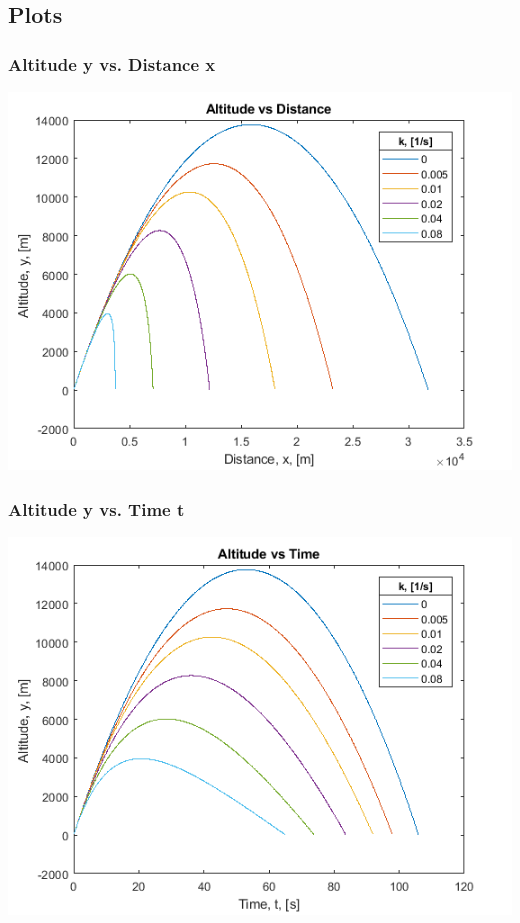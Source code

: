 \documentclass[oneside]{article}
\begin{document}
\subsection{Plots}
\subsubsection{Altitude y vs. Distance x}
\includegraphics [width=\linewidth]{graph_y-x.png}
\subsubsection{Altitude y vs. Time t}
\includegraphics [width=\linewidth]{graph_y-t.png}
\end{document}
